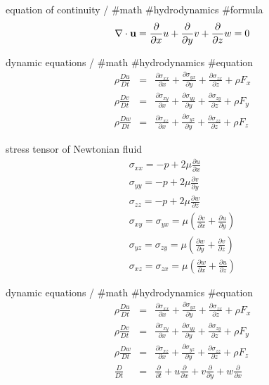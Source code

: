 equation of continuity / #math #hydrodynamics #formula
$$
\nabla \cdot {\bf u} = \frac{\partial}{\partial x}u+\frac{\partial}{\partial y}v+\frac{\partial}{\partial z}w=0
$$

dynamic equations / #math #hydrodynamics #equation 
$$
\begin{array}{lll}
\rho \frac{D u}{D t} &=& \frac{\partial \sigma_{xx}}{\partial x}+\frac{\partial \sigma_{yx}}{\partial y}+\frac{\partial \sigma_{zx}}{\partial z}+\rho F_x \\
\rho \frac{D v}{D t} &=& \frac{\partial \sigma_{xy}}{\partial x}+\frac{\partial \sigma_{yy}}{\partial y}+\frac{\partial \sigma_{zy}}{\partial z}+\rho F_y  \\
\rho \frac{D w}{D t} &=& \frac{\partial \sigma_{xz}}{\partial x}+\frac{\partial \sigma_{yz}}{\partial y}+\frac{\partial \sigma_{zz}}{\partial z}+\rho F_z 
\end{array}
$$

stress tensor of Newtonian fluid
$$
\begin{array}{lll}
\sigma_{xx}=-p+2\mu \frac{\partial u}{\partial x} \\
\sigma_{yy}=-p+2\mu \frac{\partial v}{\partial y} \\
\sigma_{zz}=-p+2\mu \frac{\partial w}{\partial z} \\
\sigma_{xy}=\sigma_{yx}=\mu\left(\frac{\partial v}{\partial x}+\frac{\partial u}{\partial y}\right) \\
\sigma_{yz}=\sigma_{zy}=\mu\left(\frac{\partial w}{\partial y}+\frac{\partial v}{\partial z}\right) \\
\sigma_{xz}=\sigma_{zx}=\mu\left(\frac{\partial w}{\partial x}+\frac{\partial u}{\partial z}\right) 
\end{array}
$$

dynamic equations / #math #hydrodynamics #equation 
$$
\begin{array}{lll}
\rho \frac{D u}{D t} &=& \frac{\partial \sigma_{xx}}{\partial x}+\frac{\partial \sigma_{yx}}{\partial y}+\frac{\partial \sigma_{zx}}{\partial z}+\rho F_x \\
\rho \frac{D v}{D t} &=& \frac{\partial \sigma_{xy}}{\partial x}+\frac{\partial \sigma_{yy}}{\partial y}+\frac{\partial \sigma_{zy}}{\partial z}+\rho F_y  \\
\rho \frac{D w}{D t} &=& \frac{\partial \sigma_{xz}}{\partial x}+\frac{\partial \sigma_{yz}}{\partial y}+\frac{\partial \sigma_{zz}}{\partial z}+\rho F_z \\
\frac{D }{D t} &=& \frac{\partial}{\partial t}+u\frac{\partial}{\partial x}+v\frac{\partial}{\partial y}+w\frac{\partial}{\partial x}
\end{array}
$$

